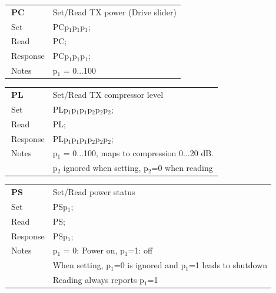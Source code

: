 \documentclass[12pt]{book}
\begin{document}
\begin{center}
\begin{tabular}{|p{2cm}|p{11cm}|}
\toprule
$\phantom{\Big|}$\textbf{\large PC} & Set/Read TX power (Drive slider) \\\cline{1-2}
$\phantom{\Big|}${\large Set} & {PCp$_1$p$_1$p$_1$;} \\\hline
$\phantom{\Big|}${\large Read} & {PC;} \\\hline
$\phantom{\Big|}${\large Response} & {PCp$_1$p$_1$p$_1$;} \\\hline
$\phantom{\Big|}${\large Notes} & \multicolumn{1}{|p{11cm}|}{p$_1$ = 0...100} \\
\bottomrule
\end{tabular}
\end{center}

\begin{center}
\begin{tabular}{|p{2cm}|p{11cm}|}
\toprule
$\phantom{\Big|}$\textbf{\large PL} & Set/Read TX compressor level \\\cline{1-2}
$\phantom{\Big|}${\large Set} & {PLp$_1$p$_1$p$_1$p$_2$p$_2$p$_2$;} \\\hline
$\phantom{\Big|}${\large Read} & {PL;} \\\hline
$\phantom{\Big|}${\large Response} & {PLp$_1$p$_1$p$_1$p$_2$p$_2$p$_2$;} \\\hline
$\phantom{\Big|}${\large Notes} & \multicolumn{1}{|p{11cm}|}{p$_1$ = 0...100, maps to compression 0...20 dB.} \\
 & \multicolumn{1}{|p{11cm}|}{p$_2$ ignored when setting, p$_2$=0 when reading} \\
\bottomrule
\end{tabular}
\end{center}

\begin{center}
\begin{tabular}{|p{2cm}|p{11cm}|}
\toprule
$\phantom{\Big|}$\textbf{\large PS} & Set/Read power status \\\cline{1-2}
$\phantom{\Big|}${\large Set} & {PSp$_1$;} \\\hline
$\phantom{\Big|}${\large Read} & {PS;} \\\hline
$\phantom{\Big|}${\large Response} & {PSp$_1$;} \\\hline
$\phantom{\Big|}${\large Notes} & \multicolumn{1}{|p{11cm}|}{p$_1$ = 0: Power on, p$_1$=1: off} \\
 & \multicolumn{1}{|p{11cm}|}{When setting, p$_1$=0 is ignored and p$_1$=1 leads to shutdown} \\
 & \multicolumn{1}{|p{11cm}|}{Reading always reports p$_1$=1} \\
\bottomrule
\end{tabular}
\end{center}
\end{document}
